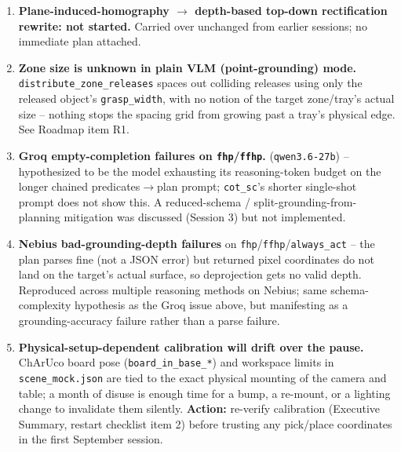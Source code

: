 \begin{enumerate}[label=\textbf{I\arabic*.}, leftmargin=1.6cm]
  \item \textbf{Plane-induced-homography $\to$ depth-based top-down
    rectification rewrite: not started.} Carried over unchanged from earlier
    sessions; no immediate plan attached.

  \item \textbf{Zone size is unknown in plain VLM (point-grounding) mode.}
    \texttt{distribute\_zone\_releases} spaces out colliding releases using
    only the released object's \texttt{grasp\_width}, with no notion of the
    target zone/tray's actual size -- nothing stops the spacing grid from
    growing past a tray's physical edge. See Roadmap item R1.

  \item \textbf{Groq empty-completion failures on \texttt{fhp}/\texttt{ffhp}.}
    (\texttt{qwen3.6-27b}) -- hypothesized to be the model exhausting its
    reasoning-token budget on the longer chained predicates$\to$plan prompt;
    \texttt{cot\_sc}'s shorter single-shot prompt does not show this. A
    reduced-schema / split-grounding-from-planning mitigation was discussed
    (Session 3) but not implemented.

  \item \textbf{Nebius bad-grounding-depth failures} on
    \texttt{fhp}/\texttt{ffhp}/\texttt{always\_act} -- the plan parses fine
    (not a JSON error) but returned pixel coordinates do not land on the
    target's actual surface, so deprojection gets no valid depth. Reproduced
    across multiple reasoning methods on Nebius; same schema-complexity
    hypothesis as the Groq issue above, but manifesting as a
    grounding-accuracy failure rather than a parse failure.

  \item \textbf{Physical-setup-dependent calibration will drift over the
    pause.} ChArUco board pose (\texttt{board\_in\_base\_*}) and workspace
    limits in \texttt{scene\_mock.json} are tied to the exact physical
    mounting of the camera and table; a month of disuse is enough time for a
    bump, a re-mount, or a lighting change to invalidate them silently.
    \textbf{Action:} re-verify calibration (Executive Summary, restart
    checklist item 2) before trusting any pick/place coordinates in the
    first September session.

\end{enumerate}
